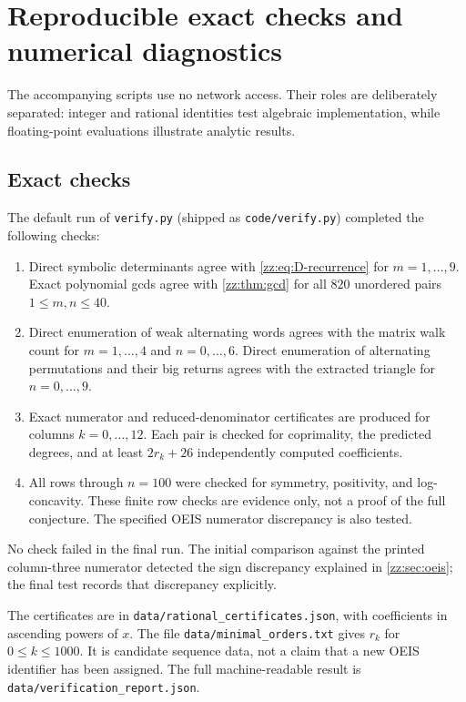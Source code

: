 \documentclass[11pt,a4paper]{article}
\theoremstyle{definition}
\begin{document}
\section{Reproducible exact checks and numerical diagnostics}
\label{zz:sec:verification}
The accompanying scripts use no network access.  Their roles are deliberately
separated: integer and rational identities test algebraic implementation,
while floating-point evaluations illustrate analytic results.

\subsection{Exact checks}
The default run of \texttt{verify.py} (shipped as \texttt{code/verify.py})
completed the following checks:
\begin{enumerate}[label=(\arabic*)]
\item Direct symbolic determinants agree with \eqref{zz:eq:D-recurrence} for
$m=1,\ldots,9$.  Exact polynomial gcds agree with \cref{zz:thm:gcd} for all
$820$ unordered pairs $1\le m,n\le40$.
\item Direct enumeration of weak alternating words agrees with the matrix
walk count for $m=1,\ldots,4$ and $n=0,\ldots,6$.  Direct enumeration of
alternating permutations and their big returns agrees with the extracted
triangle for $n=0,\ldots,9$.
\item Exact numerator and reduced-denominator certificates are produced for
columns $k=0,\ldots,12$.  Each pair is checked for coprimality, the predicted
degrees, and at least $2r_k+26$ independently computed coefficients.
\item All rows through $n=100$ were checked for symmetry, positivity, and
log-concavity.  These finite row checks are evidence only, not a proof of the
full conjecture.  The specified OEIS numerator discrepancy is also tested.
\end{enumerate}
No check failed in the final run.  The initial comparison against the printed
column-three numerator detected the sign discrepancy explained in
\cref{zz:sec:oeis}; the final test records that discrepancy explicitly.

The certificates are in \texttt{data/rational\_certificates.json}, with
coefficients in ascending powers of $x$.
The file \texttt{data/minimal\_orders.txt} gives $r_k$ for $0\le k\le1000$.
It is candidate sequence data, not a claim that a new OEIS identifier has
been assigned.  The full machine-readable result is
\texttt{data/verification\_report.json}.
\end{document}
